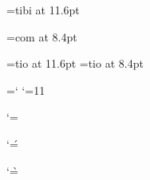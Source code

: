 \font\twelvebi=tibi at 11.6pt

\font\eighttt=com at 8.4pt	%

\font\twelvesl=tio at 11.6pt
\font\eightsl=tio at 8.4pt	%



\chardef\atcode=\catcode`\@	%
\catcode`\@=11			%


\def\MTEXMOD#1#2#3{%
 \dimen@#1\relax\PSZ@
 \FONT@{mtex}\nextiii@\textfont\thr@@\next@
 \setbox\z@\hbox{\next@ B}\p@renwd\wd\z@
 \ifx\amstexloaded@\relax
  \buffer@\fontdimen13 \next@
  \buffer\buffer@
 \fi
 \FONT@{mtex}\nextiii@\scriptfont\thr@@\next@
 \FONT@{mtex}\nextiii@\scriptscriptfont\thr@@\next@\relax}

\catcode`\@=\atcode		%





\catcode`\'=\rqcode		%

\catcode`\`=\lqcode		%

\rm

\endinput

